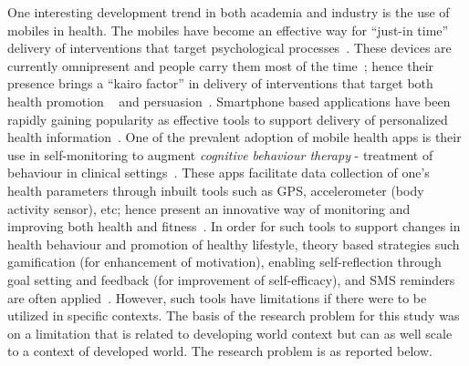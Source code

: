 One interesting development trend in both academia and industry is the use of mobiles in health. The mobiles have become an effective way for ``just-in time'' delivery of interventions that target psychological processes~\citep{hsu2014persuasive}. These devices are currently omnipresent and people carry them most of the time~\citep{mattila2008mobile}; hence their presence brings a ``kairo factor'' in delivery of interventions that target both health promotion ~\citep{pollak2010s} and persuasion~\citep{hsu2014persuasive}. Smartphone based applications have been rapidly gaining popularity as effective tools to support delivery of personalized health information~\citep{handel2011mhealth}. One of the prevalent adoption of mobile health apps is their use in self-monitoring to augment \emph{cognitive behaviour therapy} - treatment of behaviour in clinical settings~\citep{mattila2008mobile,medynskiy2010salud}. These apps facilitate data collection of one's health parameters through inbuilt tools such as GPS, accelerometer (body activity sensor), etc; hence present an innovative way of monitoring and improving both health and fitness~\citep{higgins2016smartphone}. In order for such tools to support changes in health behaviour and promotion of healthy lifestyle, theory based strategies such gamification (for enhancement of motivation), enabling self-reflection through goal setting and feedback (for improvement of self-efficacy), and SMS reminders are often applied~\citep{consolvo2009goal,cole2010text,hamari2014persuasive,hamari2014does,higgins2016smartphone}. However, such tools have limitations if there were to be utilized in specific contexts. The basis of the research problem for this study was on a limitation that is related to developing world context but can as well scale to a context of developed world. The research problem is as reported below.
